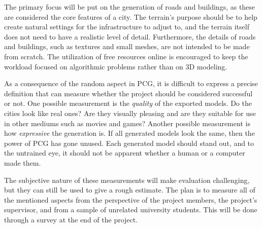 The primary focus will be put on the generation of roads and buildings, as these are considered the core features of a city.
The terrain's purpose should be to help create natural settings for the infrastructure to adjust to, and the terrain itself does not need to have a realistic level of detail.
Furthermore, the details of roads and buildings, such as textures and small meshes, are not intended to be made from scratch.
The utilization of free resources online is encouraged to keep the workload focused on algorithmic problems rather than on 3D modeling.

As a consequence of the random aspect in PCG, it is difficult to express a precise definition that can measure whether the project should be considered successful or not.
One possible measurement is the \textit{quality} of the exported models.
Do the cities look like real ones?
Are they visually pleasing and are they suitable for use in other mediums such as movies and games?
Another possible measurement is how \textit{expressive} the generation is.
If all generated models look the same, then the power of PCG has gone unused.
Each generated model should stand out, and to the untrained eye, it should not be apparent whether a human or a computer made them.

The subjective nature of these measurements will make evaluation challenging, but they can still be used to give a rough estimate.
The plan is to measure all of the mentioned aspects from the perspective of the project members, the project's supervisor, and from a sample of unrelated university students.
This will be done through a survey at the end of the project.

